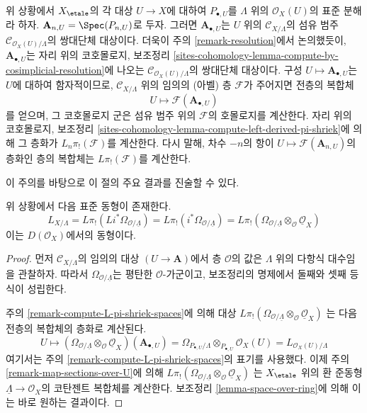 \begin{remark}
\label{remark-compute-L-pi-shriek-spaces}
위 상황에서 $X_\etale$의 각 대상 $U \to X$에 대하여
$P_{\bullet, U}$를 $\Lambda$ 위의 $\mathcal{O}_X(U)$의 표준 분해라 하자.
$\mathbf{A}_{n, U} = \Spec(P_{n, U})$로 두자. 그러면
$\mathbf{A}_{\bullet, U}$는 $U$ 위의 $\mathcal{C}_{X/\Lambda}$의 섬유 범주
$\mathcal{C}_{\mathcal{O}_X(U)/\Lambda}$의 쌍대단체 대상이다.
더욱이 주의 \ref{remark-resolution}에서 논의했듯이,
$\mathbf{A}_{\bullet, U}$는 자리 위의 코호몰로지, 보조정리
\ref{sites-cohomology-lemma-compute-by-cosimplicial-resolution}에 나오는
$\mathcal{C}_{\mathcal{O}_X(U)/\Lambda}$의 쌍대단체 대상이다.
구성 $U \mapsto \mathbf{A}_{\bullet, U}$는 $U$에 대하여 함자적이므로,
$\mathcal{C}_{X/\Lambda}$ 위의 임의의 (아벨) 층 $\mathcal{F}$가 주어지면
전층의 복합체
$$
U \longmapsto \mathcal{F}(\mathbf{A}_{\bullet, U})
$$
를 얻으며, 그 코호몰로지 군은 섬유 범주 위의 $\mathcal{F}$의 호몰로지를
계산한다. 자리 위의 코호몰로지, 보조정리
\ref{sites-cohomology-lemma-compute-left-derived-pi-shriek}에 의해
그 층화가 $L_n\pi_!(\mathcal{F})$를 계산한다.
다시 말해, 차수 $-n$의 항이
$U \mapsto \mathcal{F}(\mathbf{A}_{n, U})$의 층화인 층의 복합체는
$L\pi_!(\mathcal{F})$를 계산한다.
\end{remark}

\noindent
이 주의를 바탕으로 이 절의 주요 결과를 진술할 수 있다.

\begin{lemma}
\label{lemma-cotangent-morphism-spaces}
위 상황에서 다음 표준 동형이 존재한다.
$$
L_{X/\Lambda} = 
L\pi_!(Li^*\Omega_{\mathcal{O}/\underline{\Lambda}}) =
L\pi_!(i^*\Omega_{\mathcal{O}/\underline{\Lambda}}) =
L\pi_!(\Omega_{\mathcal{O}/\underline{\Lambda}}
\otimes_\mathcal{O} \underline{\mathcal{O}}_X)
$$
이는 $D(\mathcal{O}_X)$에서의 동형이다.
\end{lemma}

\begin{proof}
먼저 $\mathcal{C}_{X/\Lambda}$의 임의의 대상 $(U \to \mathbf{A})$에서
층 $\mathcal{O}$의 값은 $\Lambda$ 위의 다항식 대수임을 관찰하자.
따라서 $\Omega_{\mathcal{O}/\underline{\Lambda}}$는 평탄한
$\mathcal{O}$-가군이고, 보조정리의 명제에서 둘째와 셋째 등식이 성립한다.

\medskip\noindent
주의 \ref{remark-compute-L-pi-shriek-spaces}에 의해 대상
$L\pi_!(\Omega_{\mathcal{O}/\underline{\Lambda}}
\otimes_\mathcal{O} \underline{\mathcal{O}}_X)$
는 다음 전층의 복합체의 층화로 계산된다.
$$
U \mapsto
\left(\Omega_{\mathcal{O}/\underline{\Lambda}}
\otimes_\mathcal{O} \underline{\mathcal{O}}_X\right)(\mathbf{A}_{\bullet, U})
=
\Omega_{P_{\bullet, U}/\Lambda} \otimes_{P_{\bullet, U}} \mathcal{O}_X(U) =
L_{\mathcal{O}_X(U)/\Lambda}
$$
여기서는 주의 \ref{remark-compute-L-pi-shriek-spaces}의 표기를 사용했다.
이제 주의 \ref{remark-map-sections-over-U}에 의해
$L\pi_!(\Omega_{\mathcal{O}/\underline{\Lambda}}
\otimes_\mathcal{O} \underline{\mathcal{O}}_X)$
는 $X_\etale$ 위의 환 준동형 $\underline{\Lambda} \to \mathcal{O}_X$의
코탄젠트 복합체를 계산한다. 보조정리 \ref{lemma-space-over-ring}에 의해
이는 바로 원하는 결과이다.
\end{proof}






